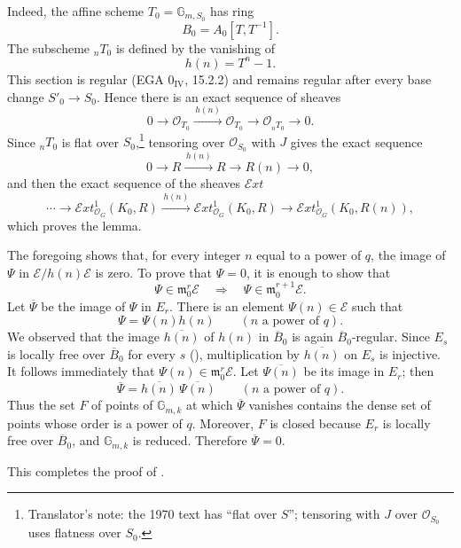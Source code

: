 Indeed, the affine scheme \(T_0=\mathbb G_{m,S_0}\) has ring
\[
  B_0=A_0[T,T^{-1}].
\]
The subscheme \({}_nT_0\) is defined by the vanishing of
\[
  h(n)=T^n-1.
\]
This section is regular (EGA \(0_{\mathrm{IV}}\), 15.2.2) and remains
regular after every base change \(S'_0\to S_0\). Hence there is an
exact sequence of sheaves
\[
  0\longrightarrow\mathcal O_{T_0}
  \xrightarrow{\,h(n)\,}\mathcal O_{T_0}
  \longrightarrow\mathcal O_{{}_nT_0}
  \longrightarrow0.
\]
Since \({}_nT_0\) is flat over \(S_0\),\footnote{Translator's note: the
1970 text has ``flat over \(S\)''; tensoring with \(J\) over
\(\mathcal O_{S_0}\) uses flatness over \(S_0\).} tensoring over
\(\mathcal O_{S_0}\) with \(J\) gives the exact sequence
\[
  0\longrightarrow R\xrightarrow{\,h(n)\,}R
  \longrightarrow R(n)\longrightarrow0,
\]
and then the exact sequence of the sheaves \(\mathcal{E}xt\)
\[
  \cdots\longrightarrow
  \mathcal{E}xt^{1}_{\mathcal O_G}(K_0,R)
  \xrightarrow{\,h(n)\,}
  \mathcal{E}xt^{1}_{\mathcal O_G}(K_0,R)
  \longrightarrow
  \mathcal{E}xt^{1}_{\mathcal O_G}(K_0,R(n)),
\]
which proves the lemma.

The foregoing shows that, for every integer \(n\) equal to a power of
\(q\), the image of \(\Psi\) in
\(\mathscr E/h(n)\mathscr E\) is zero. To prove that \(\Psi=0\), it
is enough to show that
\[
  \Psi\in\mathfrak m_0^r\mathscr E
  \quad\Longrightarrow\quad
  \Psi\in\mathfrak m_0^{r+1}\mathscr E.
\]
Let \(\overline\Psi\) be the image of \(\Psi\) in \(E_r\). There is
an element \(\Psi(n)\in\mathscr E\) such that
\[
  \Psi=\Psi(n)h(n)
  \qquad(n\text{ a power of }q).
\]
We observed that the image \(\overline{h(n)}\) of \(h(n)\) in \(\overline B_0\)
is again \(\overline B_0\)-regular. Since \(E_s\) is locally free over \(\overline B_0\)
for every \(s\) (), multiplication by \(\overline{h(n)}\) on
\(E_s\) is injective. It follows immediately that
\(\Psi(n)\in\mathfrak m_0^r\mathscr E\). Let
\(\overline{\Psi(n)}\) be its image in \(E_r\); then
\[
  \overline\Psi=\overline{h(n)}\,\overline{\Psi(n)}
  \qquad(n\text{ a power of }q).
\]
Thus the set \(F\) of points of \(\mathbb G_{m,k}\) at which
\(\overline\Psi\) vanishes contains the dense set of points whose
order is a power of \(q\). Moreover, \(F\) is closed because \(E_r\)
is locally free over \(\overline B_0\), and \(\mathbb G_{m,k}\) is reduced.
Therefore \(\overline\Psi=0\).

This completes the proof of .

